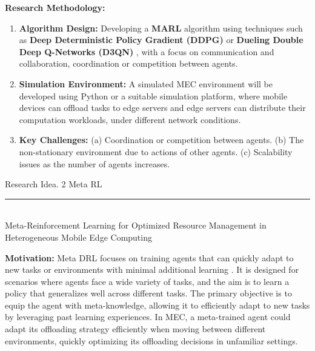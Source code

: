 \documentclass[12pt]{article}
\begin{document}
\noindent\textbf{\large Research Methodology: }
\begin{enumerate} 
	\item \textbf{Algorithm Design:} Developing a \textbf{MARL} algorithm using techniques such as \textbf{Deep Deterministic Policy Gradient (DDPG)} \cite{lillicrap2015continuous} or \textbf{Dueling Double Deep Q-Networks (D3QN)} \cite{van2016deep}, with a focus on communication and collaboration, coordination or competition between agents. \vspace{-1mm}
	\item \textbf{Simulation Environment:} A simulated MEC environment will be developed using Python or a suitable simulation platform, where mobile devices can offload tasks to edge servers and edge servers can distribute their computation workloads, under different network conditions.\vspace{-1mm}
	\item \textbf{Key Challenges:} (a) Coordination or competition between agents. (b) The non-stationary environment due to actions of other agents.  (c) Scalability issues as the number of agents increases.
\end{enumerate}


\newpage




\begin{center} 
	
	
	\vspace{-17mm}
	
	\large Research Idea. 2  \hfill Meta RL \vspace{1mm} \hrule
	
	\vspace{-1mm}
	
	
	
	\textcolor{white}{i} \\ \LARGE Meta-Reinforcement Learning for Optimized Resource Management in Heterogeneous Mobile Edge Computing  \vspace{6mm}\\
	
\end{center}
\vspace{-5mm}

\noindent\textbf{\large Motivation:  }
\noindent
Meta DRL focuses on training agents that can quickly adapt to new tasks or environments with minimal additional learning \cite{beck2023survey}. It is designed for scenarios where agents face a wide variety of tasks, and the aim is to learn a policy that generalizes well across different tasks. The primary objective is to equip the agent with meta-knowledge, allowing it to efficiently adapt to new tasks by leveraging past learning experiences. In MEC, a meta-trained agent could adapt its offloading strategy efficiently when moving between different environments, quickly optimizing its offloading decisions in unfamiliar settings.
\end{document}
